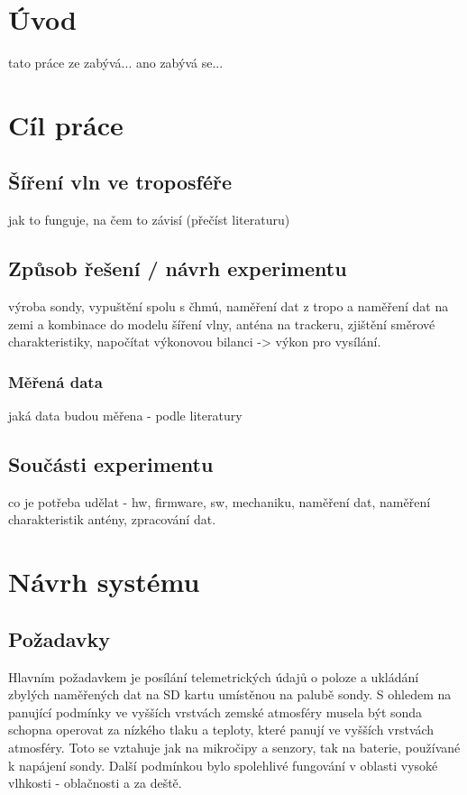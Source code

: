\documentclass[twoside]{ctuthesis}
\theoremstyle{plain}
\theoremstyle{definition}
\theoremstyle{note}
\begin{document}
\maketitle

\chapter{Úvod}
tato práce ze zabývá... ano zabývá se...



\chapter{Cíl práce}

	\section{Šíření vln ve troposféře}
	jak to funguje, na čem to závisí (přečíst literaturu)

	\section{Způsob řešení / návrh experimentu}
	výroba sondy, vypuštění spolu s čhmú, naměření dat z tropo a naměření dat na zemi a kombinace do modelu šíření vlny, anténa na trackeru, zjištění směrové charakteristiky, napočítat výkonovou bilanci -> výkon pro vysílání.
		\subsection{Měřená data}	
		jaká data budou měřena - podle literatury

	\section{Součásti experimentu}
	co je potřeba udělat - hw, firmware, sw, mechaniku, naměření dat, naměření charakteristik antény, zpracování dat. 


\chapter{Návrh systému}

	\section{Požadavky}
	Hlavním požadavkem je posílání telemetrických údajů o poloze a ukládání zbylých naměřených dat na SD kartu umístěnou na palubě sondy. S ohledem na panující podmínky ve vyšších vrstvách zemské atmosféry musela být sonda schopna operovat za nízkého tlaku a teploty, které panují ve vyšších vrstvách atmosféry. Toto se vztahuje jak na mikročipy a senzory, tak na baterie, používané k napájení sondy. Další podmínkou bylo spolehlivé fungování v oblasti vysoké vlhkosti - oblačnosti a za deště. 
\end{document}
